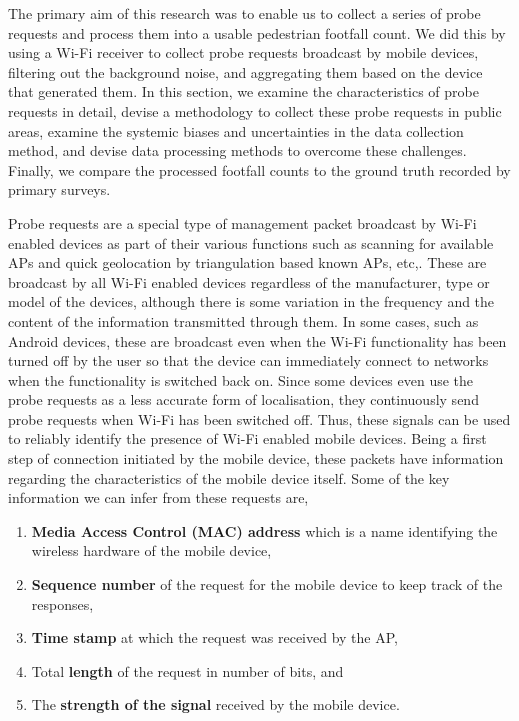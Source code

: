 The primary aim of this research was to enable us to collect a series of probe
requests and process them into a usable pedestrian footfall count. We did this
by using a Wi-Fi receiver to collect probe requests broadcast by mobile
devices, filtering out the background noise, and aggregating them based on the
device that generated them. In this section, we examine the
characteristics of probe requests in detail, devise a methodology to collect
these probe requests in public areas, examine the systemic biases and
uncertainties in the data collection method, and devise data processing methods
to overcome these challenges. Finally, we compare the processed footfall counts
to the ground truth recorded by primary surveys.

Probe requests are a special type of management packet broadcast by Wi-Fi
enabled devices as part of their various functions such as scanning for
available APs and quick geolocation by triangulation based known APs, etc,.
These are broadcast by all Wi-Fi enabled devices regardless of the manufacturer,
type or model of the devices, although there is some variation in the frequency
and the content of the information transmitted through them. In some cases, such
as Android devices, these are broadcast even when the Wi-Fi functionality has
been turned off by the user so that the device can immediately connect to
networks when the functionality is switched back on. Since some devices even use
the probe requests as a less accurate form of localisation, they continuously
send probe requests when Wi-Fi has been switched off. Thus, these signals can be
used to reliably identify the presence of Wi-Fi enabled mobile devices. Being a
first step of connection initiated by the mobile device, these packets have
information regarding the characteristics of the mobile device itself. Some of
the key information we can infer from these requests are,

\begin{enumerate} 
\item \textbf{Media Access Control (MAC) address} which is a name identifying
	the wireless hardware of the mobile device, 
\item \textbf{Sequence number} of the request for the mobile device to keep
	track of the responses, 
\item \textbf{Time stamp} at which the request was received by the AP, 
\item Total \textbf{length} of the request in number of bits, and 
\item The \textbf{strength of the signal} received by the mobile device.
\end{enumerate}

